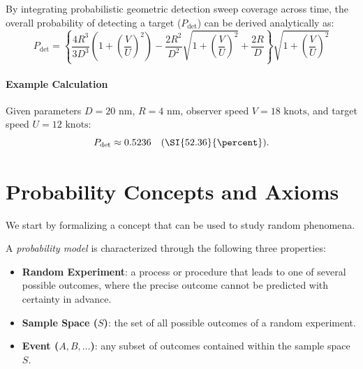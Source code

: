 \begin{example}
    By integrating probabilistic geometric detection sweep coverage across time, the overall probability of detecting a target ($P_{\text{det}}$) can be derived analytically as:
    \[
        P_{\text{det}} = \left\{ \frac{4R^{3}}{3D^{3}} \left(1 + \left(\frac{V}{U}\right)^{2}\right) - \frac{2R^{2}}{D^{2}} \sqrt{1 + \left(\frac{V}{U}\right)^{2}} + \frac{2R}{D} \right\} \sqrt{1 + \left(\frac{V}{U}\right)^{2}}
    \]

    \paragraph{Example Calculation}
    Given parameters $D = 20\text{ nm}$, $R = 4\text{ nm}$, observer speed $V = 18\text{ knots}$, and target speed $U = 12\text{ knots}$:
    \[
        P_{\text{det}} \approx 0.5236 \quad (\text{\SI{52.36}{\percent}}).
    \]
\end{example}

\newpage


\section*{Probability Concepts and Axioms}

We start by formalizing a concept that can be used to study random phenomena.

\begin{definition}
    A \emph{probability model} is characterized through the following three properties:\medskip

    \begin{itemize}\setlength\itemsep{1em}
        \item \textbf{Random Experiment}: a process or procedure that leads to one of several possible outcomes, where the precise outcome cannot be predicted with certainty in advance.
        \item \textbf{Sample Space ($S$)}: the set of all possible outcomes of a random experiment.
        \item \textbf{Event ($A, B, \dots$)}: any subset of outcomes contained within the sample space $S$.
    \end{itemize}
\end{definition}

